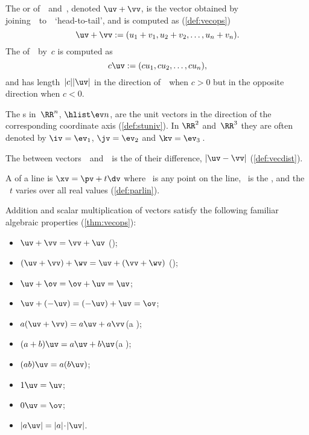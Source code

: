 \begin{itemize}
\itemme The  or  of~\uv\ and~\vv, denoted \(\uv+\vv\), is the vector obtained by joining~\vv\ to~\uv\ `head-to-tail', and is computed as (\autoref{def:vecops})
\begin{equation*}
\uv+\vv:=(u_1+v_1,u_2+v_2,\ldots,u_n+v_n).
\end{equation*}
The  of~\uv\ by~\(c\) is computed as
\begin{equation*}
c\uv:=(cu_1,cu_2,\ldots,cu_n),
\end{equation*}
and has length~\(|c||\uv|\) in the direction of~\uv\ when \(c>0\) but in the opposite direction when \(c<0\).

\itemme The s in~\(\RR^n\), \(\hlist\ev n\), are the unit vectors in the direction of the corresponding coordinate axis (\autoref{def:stuniv}).
In \(\RR^2\) and~\(\RR^3\) they are often denoted by \(\iv=\ev_1\), \(\jv=\ev_2\) and \(\kv=\ev_3\)\,.

\itemlo The  between vectors~\uv\ and~\vv\ is the  of their difference, \(|\uv-\vv|\) (\autoref{def:vecdist}).

\itemlo A  of a line is \(\xv=\pv+t\dv\) where \pv~is any point on the line, \dv~is the , and the  ~\(t\) varies over all real values (\autoref{def:parlin}).

\itemhi Addition and scalar multiplication of vectors satisfy the following familiar algebraic properties (\autoref{thm:vecops}):
\begin{itemize}
\item \(\uv+\vv=\vv+\uv\) \quad();
\item \((\uv+\vv)+\wv=\uv+(\vv+\wv)\) \quad();
\item \(\uv+\ov=\ov+\uv=\uv\);
\item \(\uv+(-\uv)=(-\uv)+\uv=\ov\);
\item \(a(\uv+\vv)=a\uv+a\vv\)\quad(a );
\item \((a+b)\uv=a\uv+b\uv\)\quad(a );
\item \((ab)\uv=a(b\uv)\);
\item \(1\uv=\uv\);
\item \(0\uv=\ov\);
\item \(|a\uv|=|a|\cdot|\uv|\).
\end{itemize}





\end{itemize}
